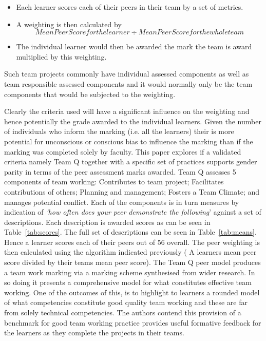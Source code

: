 \documentclass[sigconf, anonymous=true]{acmart}
\begin{document}
\begin{itemize}
\item Each learner scores each of their peers in their team by a set of metrics. 
\item A weighting is then calculated by \[ Mean Peer Score for the learner \div Mean Peer Score for the whole team\]
\item The individual learner would then be awarded the mark the team is award multiplied by this weighting.
\end{itemize}

Such team projects commonly have individual assessed components as well as team responsible assessed components and it would normally only be the team components that would be subjected to the weighting.

Clearly the criteria used will have a significant influence on the weighting and hence potentially the grade awarded to the individual learners.  Given the number of individuals who inform the marking (i.e. all the learners) their is more potential for unconscious or conscious bias to influence the marking than if the marking was completed solely by faculty. This paper explores if a validated   criteria namely Team Q \cite{Britton2017} together with a specific set of practices supports gender parity in terms of the peer assessment marks awarded.  Team Q \cite{Britton2017} assesses 5 components of team working: Contributes to team project; Facilitates contributions of others; Planning and management; Fosters a Team Climate; and manages potential conflict. Each of the components is in turn measures by indication of \textit{'how often does your peer demonstrate the following}' against a set of descriptions. Each description is awarded scores as can be seen in Table~\ref{tab:scores}. The full set of descriptions can be seen in Table~\ref{tab:means}.  Hence a learner scores each of their peers out of 56 overall. The peer weighting is then calculated using the algorithm indicated previously ( A learners mean peer score divided by their teams mean peer score). 
The Team Q peer model produces a team work marking via a marking scheme synthesised from wider research. In so doing it presents a comprehensive model for what constitutes effective team working. One of the outcomes of this, is to highlight to learners a rounded model of what competencies constitute good quality team working and these are far from solely technical competencies. The authors contend this provision of a benchmark for good team working practice provides useful formative feedback for the learners as they complete the projects in their teams.
\end{document}
